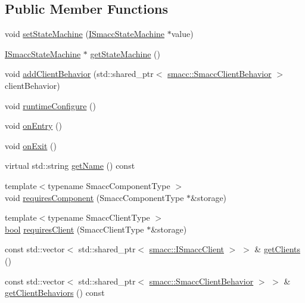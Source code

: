 \subsection*{Public Member Functions}
\begin{DoxyCompactItemize}
\item 
void \hyperlink{classsmacc_1_1ISmaccOrthogonal_a0fa0901a322f62a604c279c06d34f2f0}{set\+State\+Machine} (\hyperlink{classsmacc_1_1ISmaccStateMachine}{I\+Smacc\+State\+Machine} $\ast$value)
\item 
\hyperlink{classsmacc_1_1ISmaccStateMachine}{I\+Smacc\+State\+Machine} $\ast$ \hyperlink{classsmacc_1_1ISmaccOrthogonal_aae265ec480b8ed552ddc79afd2d93a62}{get\+State\+Machine} ()
\item 
void \hyperlink{classsmacc_1_1ISmaccOrthogonal_a55097443978ca7955d909df4f5f2c04e}{add\+Client\+Behavior} (std\+::shared\+\_\+ptr$<$ \hyperlink{classsmacc_1_1SmaccClientBehavior}{smacc\+::\+Smacc\+Client\+Behavior} $>$ client\+Behavior)
\item 
void \hyperlink{classsmacc_1_1ISmaccOrthogonal_a47ae4af0f05ea31cc98b4e1d792d1126}{runtime\+Configure} ()
\item 
void \hyperlink{classsmacc_1_1ISmaccOrthogonal_a35f4d2955445dc1a4b2dafbca2f0bd16}{on\+Entry} ()
\item 
void \hyperlink{classsmacc_1_1ISmaccOrthogonal_af7c30055b3cef6f65a83ae412ab34143}{on\+Exit} ()
\item 
virtual std\+::string \hyperlink{classsmacc_1_1ISmaccOrthogonal_a45a444be97410cb061f8b9d5d77ee9b7}{get\+Name} () const
\item 
{\footnotesize template$<$typename Smacc\+Component\+Type $>$ }\\void \hyperlink{classsmacc_1_1ISmaccOrthogonal_a3f66cf4680e3026a6789769c8ea1aa83}{requires\+Component} (Smacc\+Component\+Type $\ast$\&storage)
\item 
{\footnotesize template$<$typename Smacc\+Client\+Type $>$ }\\\hyperlink{classbool}{bool} \hyperlink{classsmacc_1_1ISmaccOrthogonal_a602e16b09f8a1b3de889f2f3d90a3211}{requires\+Client} (Smacc\+Client\+Type $\ast$\&storage)
\item 
const std\+::vector$<$ std\+::shared\+\_\+ptr$<$ \hyperlink{classsmacc_1_1ISmaccClient}{smacc\+::\+I\+Smacc\+Client} $>$ $>$ \& \hyperlink{classsmacc_1_1ISmaccOrthogonal_a83f1d5390ec41d91566e6f034b25b7d9}{get\+Clients} ()
\item 
const std\+::vector$<$ std\+::shared\+\_\+ptr$<$ \hyperlink{classsmacc_1_1SmaccClientBehavior}{smacc\+::\+Smacc\+Client\+Behavior} $>$ $>$ \& \hyperlink{classsmacc_1_1ISmaccOrthogonal_a361c73750f24bcc4f1fa1db275bf957d}{get\+Client\+Behaviors} () const

\end{DoxyCompactItemize}
